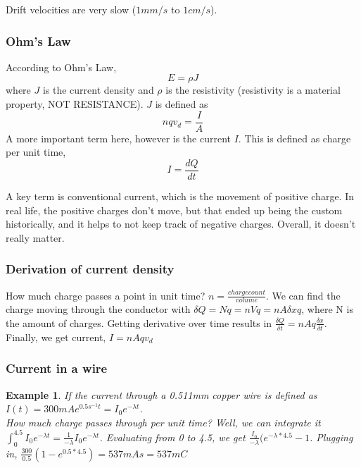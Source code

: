 \documentclass{article}
\newtheorem{example}{Example}
\begin{document}
Drift velocities are very slow ($1 mm/s$ to $1 cm/s$).

\subsubsection{Ohm's Law}

According to Ohm's Law, \begin{equation} E=\rho J \end{equation} where $J$ is the current density and $\rho$ is the resistivity (resistivity is a material property, NOT RESISTANCE). 
$J$ is defined as \begin{equation}nqv_d=\frac{I}{A} \end{equation}
A more important term here, however is the current $I$. This is defined as charge per unit time, \begin{equation} I=\frac{dQ}{dt} \end{equation}

A key term is conventional current, which is the movement of positive charge. In real life, the positive charges don't move, but that ended up being 
the custom historically, and it helps to not keep track of negative charges. Overall, it doesn't really matter.

\subsubsection{Derivation of current density}

How much charge passes a point in unit time? $n=\frac{charge count}{volume}$. We can find the charge moving through the conductor with $\delta Q=Nq=nVq=nA\delta x q$, where N is the amount of charges. 
Getting derivative over time results in $\frac{\delta Q}{\delta t}=nAq\frac{\delta x}{\delta t}$. Finally, we get current, $I=nAqv_d$

\subsubsection{Current in a wire}

\begin{example}
	If the current through a 0.511mm copper wire is defined as $I(t)=300mAe^{0.5s^{-1}t}=I_0e^{-\lambda t}$.\\
	How much charge passes through per unit time? Well, we can integrate it $\int_0^4.5{I_0e^{-\lambda t}}=\frac{1}{-\lambda}I_0e^{-\lambda t}$. Evaluating
	from 0 to 4.5, we get $\frac{I_0}{-\lambda}(e^{-\lambda*4.5}-1$. Plugging in, $\frac{300}{0.5}(1-e^{0.5*4.5})=537 mA s=537 mC$
\end{example}
\end{document}
